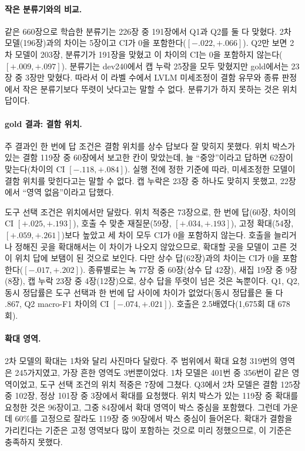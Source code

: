 \documentclass[11pt]{article}
\begin{document}
\paragraph{작은 분류기와의 비교.} 같은 660장으로 학습한 분류기는 226장 중 191장에서 Q1과 Q2를 둘 다 맞혔다. 2차 모델(196장)과의 차이는 5장이고 CI가 0을 포함한다($[-.022,+.066]$). Q2만 보면 2차 모델이 203장, 분류기가 191장을 맞혔고 이 차이의 CI는 0을 포함하지 않는다($[+.009,+.097]$). 분류기는 dev240에서 캡 누락 25장을 모두 맞혔지만 gold에서는 23장 중 3장만 맞혔다. 따라서 이 라벨 수에서 LVLM 미세조정이 결함 유무와 종류 판정에서 작은 분류기보다 뚜렷이 낫다고는 말할 수 없다. 분류기가 하지 못하는 것은 위치 답이다.

\paragraph{gold 결과: 결함 위치.} 주 결과인 한 번에 답 조건은 결함 위치를 상수 답보다 잘 맞히지 못했다. 위치 박스가 있는 결함 119장 중 60장에서 보고한 칸이 맞았는데, 늘 ``중앙''이라고 답하면 62장이 맞는다(차이의 CI $[-.118,+.084]$). 실행 전에 정한 기준에 따라, 미세조정한 모델이 결함 위치를 맞힌다고는 말할 수 없다. 캡 누락은 23장 중 하나도 맞히지 못했고, 22장에서 ``영역 없음''이라고 답했다.

도구 선택 조건은 위치에서만 달랐다. 위치 적중은 73장으로, 한 번에 답(60장, 차이의 CI $[+.025,+.193]$), 호출 수 맞춘 재질문(59장, $[+.034,+.193]$), 고정 확대(54장, $[+.059,+.261]$)보다 높았고 세 차이 모두 CI가 0을 포함하지 않는다. 호출을 늘리거나 정해진 곳을 확대해서는 이 차이가 나오지 않았으므로, 확대할 곳을 모델이 고른 것이 위치 답에 보탬이 된 것으로 보인다. 다만 상수 답(62장)과의 차이는 CI가 0을 포함한다($[-.017,+.202]$). 종류별로는 녹 77장 중 60장(상수 답 42장), 새집 19장 중 9장(8장), 캡 누락 23장 중 4장(12장)으로, 상수 답을 뚜렷이 넘은 것은 녹뿐이다. Q1, Q2, 동시 정답률은 도구 선택과 한 번에 답 사이에 차이가 없었다(동시 정답률은 둘 다 .867, Q2 macro-F1 차이의 CI $[-.074,+.021]$). 호출은 2.5배였다(1,675회 대 678회).

\paragraph{확대 영역.} 2차 모델의 확대는 1차와 달리 사진마다 달랐다. 주 범위에서 확대 요청 319번의 영역은 245가지였고, 가장 흔한 영역도 3번뿐이었다. 1차 모델은 401번 중 356번이 같은 영역이었고, 도구 선택 조건의 위치 적중은 7장에 그쳤다. Q3에서 2차 모델은 결함 125장 중 102장, 정상 101장 중 3장에서 확대를 요청했다. 위치 박스가 있는 119장 중 확대를 요청한 것은 96장이고, 그중 84장에서 확대 영역이 박스 중심을 포함했다. 그런데 가운데 60\%를 고정으로 잘라도 119장 중 90장에서 박스 중심이 들어온다. 확대가 결함을 가리킨다는 기준은 고정 영역보다 많이 포함하는 것으로 미리 정했으므로, 이 기준은 충족하지 못했다.
\end{document}
